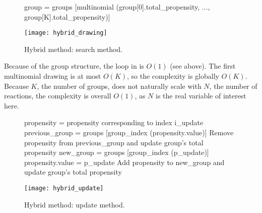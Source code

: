 \begin{figure}[!h]
  \centering
  \begin{minipage}{\textwidth}
    \centering
    \begin{algorithm}[H]
      \SetAlgoLined
      \KwData{$K+1$ groups, group k containing propensities whose value falls in the interval $(0,b]$ if k=0, $(2^{k-1}b, 2^kb]$ if k $>$ 0. Propensities are stored as a couple containing their value and original index.}
      group = groups [multinomial (group[0].total\_propensity, ..., 
        group[K].total\_propensity)]\;
    \end{algorithm}
    \texttt{[image: hybrid\_drawing]}
  \end{minipage}
  \caption{Hybrid method: search method.}
  \label{fig:hybrid_search}
\end{figure}

Because of the group structure, the loop in  is $O(1)$ (see above). The first multinomial drawing is at most $O(K)$, so the complexity is globally $O(K)$. Because $K$, the number of groups, does not naturally scale with $N$, the number of reactions, the complexity is overall $O(1)$, as $N$ is the real variable of interest here.


\begin{figure}[!h]
  \centering
  \begin{minipage}{\textwidth}
    \centering
    \begin{algorithm}[H]
      \SetAlgoLined
      \KwData{$K+1$ groups, group k containing propensities whose value falls in the interval $(0,b]$ if k=0, $(2^{k-1}b, 2^kb]$ if k $>$ 0. Propensities are stored as a couple containing their value and original index. Index i\_update of propensity to update, new propensity value p\_update.}
  propensity = propensity corresponding to index i\_update\;
  previous\_group = groups [group\_index (propensity.value)]\;
  Remove propensity from previous\_group and update group's total propensity\;
  new\_group = groups [group\_index (p\_update)]\;
  propensity.value = p\_update\;
  Add propensity to new\_group and update group's total propensity\;
    \end{algorithm}
    \texttt{[image: hybrid\_update]}
  \end{minipage}
  \caption{Hybrid method: update method.}
  \label{fig:hybrid_update}
\end{figure}


